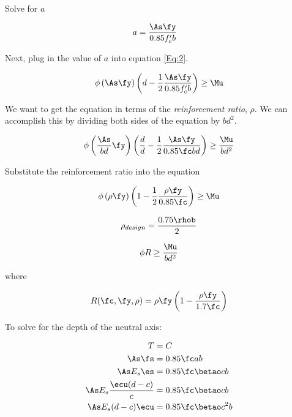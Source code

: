 Solve for $a$

\begin{align}
	a&=\frac{\As \fy}{0.85f'_cb}
\end{align}


Next, plug in the value of $a$ into equation \ref{Eq:2}.

\begin{align}
	\phi
	\left(\As \fy\right)
	\left(d-\frac{1}{2}\frac{\As \fy}{0.85f'_cb}\right)
	\geq
	\Mu
\end{align}

We want to get the equation in terms of the \textit{reinforcement ratio}, $\rho$. We can accomplish this by dividing both sides of the equation by $bd^2$.


\begin{align}
	\phi
	\left(\frac{\As}{bd} \fy\right)
	\left(\frac{d}{d} - \frac12\frac{\As\fy}{0.85\fc bd}\right)
	\geq
	\frac{\Mu}{bd^2}
\end{align}


Substitute the reinforcement ratio into the equation

\begin{align}
	\phi
	\left(\rho \fy\right)
	\left(1 - \frac12\frac{\rho \fy}{0.85 \fc}\right)
	\geq
	\Mu
\end{align}


\begin{align}
	\rho_{design}=\frac{0.75\rhob}{2}
\end{align}


\begin{align}
	\phi R \geq \frac{\Mu}{bd^2}
	\label{Eq:design2}
\end{align}

where

\begin{align}
	R(\fc,\fy,\rho) =
	\rho \fy
	\left(1-\frac{\rho\fy}{1.7\fc}\right)
\end{align}



To solve for the depth of the neutral axis:

\begin{align}
	T &= C\\
	\As\fs &=0.85\fc a b\\
	\As E_s \es &= 0.85\fc \betao c b\\
	\As E_s \frac{\ecu(d-c)}{c} &= 0.85\fc \betao c b\\
	\As E_s (d-c) \ecu &= 0.85 \fc \betao c^2 b
\end{align}


